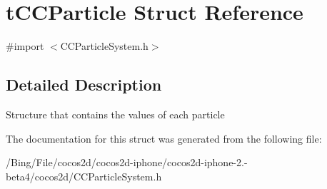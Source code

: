 \hypertarget{structt_c_c_particle}{\section{t\-C\-C\-Particle Struct Reference}
\label{structt_c_c_particle}
}


{\ttfamily \#import $<$C\-C\-Particle\-System.\-h$>$}



\subsection{Detailed Description}
Structure that contains the values of each particle 

The documentation for this struct was generated from the following file\-:\begin{DoxyCompactItemize}
\item 
/\-Bing/\-File/cocos2d/cocos2d-\/iphone/cocos2d-\/iphone-\/2.-\/beta4/cocos2d/C\-C\-Particle\-System.\-h\end{DoxyCompactItemize}

